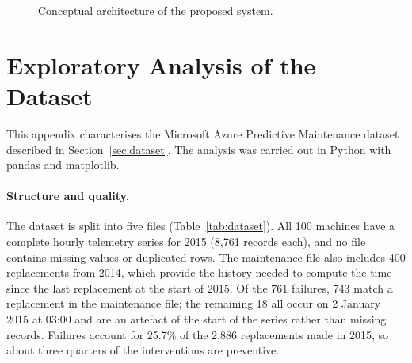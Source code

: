 \begin{figure}[!htbp]
\centering
{}
\caption{Conceptual architecture of the proposed system.}
\label{fig:arquitetura}
\end{figure}

\section{Exploratory Analysis of the Dataset}
\label{app:eda}

This appendix characterises the Microsoft Azure Predictive Maintenance dataset described in Section~\ref{sec:dataset}. The analysis was carried out in Python with pandas and matplotlib.

\paragraph{Structure and quality.} The dataset is split into five files (Table~\ref{tab:dataset}). All 100 machines have a complete hourly telemetry series for 2015 (8,761 records each), and no file contains missing values or duplicated rows. The maintenance file also includes 400 replacements from 2014, which provide the history needed to compute the time since the last replacement at the start of 2015. Of the 761 failures, 743 match a replacement in the maintenance file; the remaining 18 all occur on 2 January 2015 at 03:00 and are an artefact of the start of the series rather than missing records. Failures account for 25.7\% of the 2,886 replacements made in 2015, so about three quarters of the interventions are preventive.

